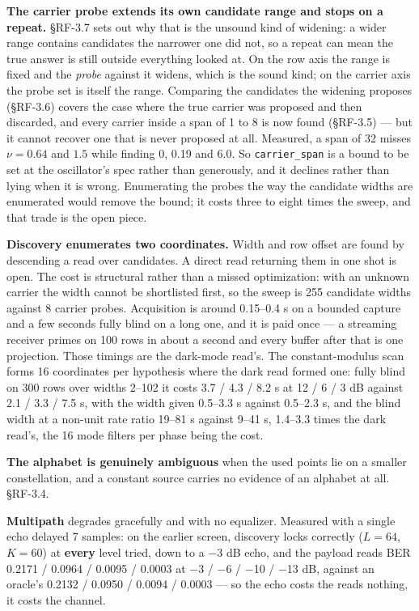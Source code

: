 \documentclass[10pt,letterpaper,twocolumn]{article}
\begin{document}
\textbf{The carrier probe extends its own candidate range and stops on a repeat.} §RF-3.7 sets out why that is the unsound kind of widening: a wider range contains candidates the narrower one did not, so a repeat can mean the true answer is still outside everything looked at. On the row axis the range is fixed and the \emph{probe} against it widens, which is the sound kind; on the carrier axis the probe set is itself the range. Comparing the candidates the widening proposes (§RF-3.6) covers the case where the true carrier was proposed and then discarded, and every carrier inside a span of 1 to 8 is now found (§RF-3.5) --- but it cannot recover one that is never proposed at all. Measured, a span of 32 misses \(\nu = 0.64\) and \(1.5\) while finding 0, 0.19 and 6.0. So \texttt{carrier\_\allowbreak{}span} is a bound to be set at the oscillator's spec rather than generously, and it declines rather than lying when it is wrong. Enumerating the probes the way the candidate widths are enumerated would remove the bound; it costs three to eight times the sweep, and that trade is the open piece.

\textbf{Discovery enumerates two coordinates.} Width and row offset are found by descending a read over candidates. A direct read returning them in one shot is open. The cost is structural rather than a missed optimization: with an unknown carrier the width cannot be shortlisted first, so the sweep is 255 candidate widths against 8 carrier probes. Acquisition is around 0.15--0.4 s on a bounded capture and a few seconds fully blind on a long one, and it is paid once --- a streaming receiver primes on 100 rows in about a second and every buffer after that is one projection. Those timings are the dark-mode read's. The constant-modulus scan forms 16 coordinates per hypothesis where the dark read formed one: fully blind on 300 rows over widths 2--102 it costs 3.7 / 4.3 / 8.2 s at 12 / 6 / 3 dB against 2.1 / 3.3 / 7.5 s, with the width given 0.5--3.3 s against 0.5--2.3 s, and the blind width at a non-unit rate ratio 19--81 s against 9--41 s, 1.4--3.3 times the dark read's, the 16 mode filters per phase being the cost.

\textbf{The alphabet is genuinely ambiguous} when the used points lie on a smaller constellation, and a constant source carries no evidence of an alphabet at all. §RF-3.4.

\textbf{Multipath} degrades gracefully and with no equalizer. Measured with a single echo delayed 7 samples: on the earlier screen, discovery locks correctly (\(L=64\), \(K=60\)) at \textbf{every} level tried, down to a −3 dB echo, and the payload reads BER 0.2171 / 0.0964 / 0.0095 / 0.0003 at −3 / −6 / −10 / −13 dB, against an oracle's 0.2132 / 0.0950 / 0.0094 / 0.0003 --- so the echo costs the reads nothing, it costs the channel.
\end{document}
